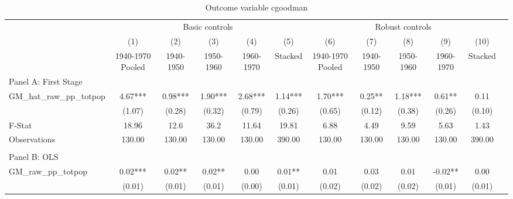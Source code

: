  \begin{table}[htbp]\centering {} \begin{threeparttable} \caption{Outcome variable cgoodman} \begin{tabular}{l*{11}{c}} \toprule
          &\multicolumn{5}{c}{Basic controls}                                   &\multicolumn{5}{c}{Robust controls}                                  \\\cmidrule(lr){2-6}\cmidrule(lr){7-11}
          &\multicolumn{1}{c}{(1)}&\multicolumn{1}{c}{(2)}&\multicolumn{1}{c}{(3)}&\multicolumn{1}{c}{(4)}&\multicolumn{1}{c}{(5)}&\multicolumn{1}{c}{(6)}&\multicolumn{1}{c}{(7)}&\multicolumn{1}{c}{(8)}&\multicolumn{1}{c}{(9)}&\multicolumn{1}{c}{(10)}\\
          &\multicolumn{1}{c}{1940-1970 Pooled}&\multicolumn{1}{c}{1940-1950}&\multicolumn{1}{c}{1950-1960}&\multicolumn{1}{c}{1960-1970}&\multicolumn{1}{c}{Stacked}&\multicolumn{1}{c}{1940-1970 Pooled}&\multicolumn{1}{c}{1940-1950}&\multicolumn{1}{c}{1950-1960}&\multicolumn{1}{c}{1960-1970}&\multicolumn{1}{c}{Stacked}\\
\cmidrule(lr){1-11}
\multicolumn{10}{l}{Panel A: First Stage}\\
\cmidrule(lr){1-11}
GM\_hat\_raw\_pp\_totpop&      4.67***&      0.98***&      1.90***&      2.68***&      1.14***&      1.70***&      0.25** &      1.18***&      0.61** &      0.11   \\
          &    (1.07)   &    (0.28)   &    (0.32)   &    (0.79)   &    (0.26)   &    (0.65)   &    (0.12)   &    (0.38)   &    (0.26)   &    (0.10)   \\
\midrule
F-Stat    &     18.96   &      12.6   &      36.2   &     11.64   &     19.81   &      6.88   &      4.49   &      9.59   &      5.63   &      1.43   \\
Observations&    130.00   &    130.00   &    130.00   &    130.00   &    390.00   &    130.00   &    130.00   &    130.00   &    130.00   &    390.00   \\
\cmidrule[\heavyrulewidth](lr){1-11} \\ \cmidrule[\heavyrulewidth](lr){1-11}
\multicolumn{10}{l}{Panel B: OLS}\\
\cmidrule(lr){1-11}
GM\_raw\_pp\_totpop&      0.02***&      0.02** &      0.02** &      0.00   &      0.01** &      0.01   &      0.03   &      0.01   &     -0.02** &      0.00   \\
          &    (0.01)   &    (0.01)   &    (0.01)   &    (0.00)   &    (0.01)   &    (0.02)   &    (0.02)   &    (0.02)   &    (0.01)   &    (0.01)   \\

\end{tabular}
\end{threeparttable}
\end{table}
